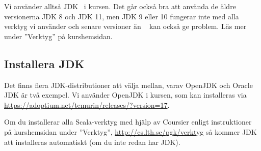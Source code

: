 Vi använder alltså JDK \JDKVersion~i kursen. Det går också bra att använda de äldre versionerna JDK 8 och JDK 11, men JDK 9 eller 10 fungerar inte med alla verktyg vi använder och senare versioner än \JDKVersion~ kan också ge problem. Läs mer under ''Verktyg'' på kurshemsidan.






\subsection{Installera JDK}\label{appendix:compile:install-jdk}

Det finns flera JDK-distributioner att välja mellan, varav OpenJDK och Oracle JDK är två exempel. Vi använder OpenJDK i kursen, som kan installeras via \\ \url{https://adoptium.net/temurin/releases/?version=17}. 

Om du installerar alla Scala-verktyg med hjälp av Coursier enligt instruktioner på kurshemsidan under ''Verktyg'', \url{http://cs.lth.se/pgk/verktyg} så kommer JDK att installeras automatiskt (om du inte redan har JDK). %

